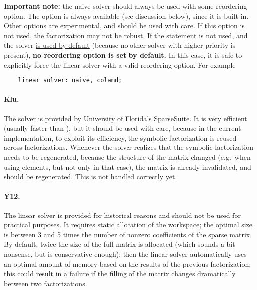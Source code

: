\bigskip
\begin{minipage}{.9\textwidth}
\textbf{Important note:} the naive solver should always be used
with some reordering option.
The  option is always available (see discussion below),
since it is built-in.
Other options are experimental, and should be used with care.
If this option is not used, the factorization may not be robust.
If the  statement is \underline{not used},
and the  solver \underline{is used by default}
(because no other solver with higher priority is present),
\textbf{no reordering option is set by default.}
In this case, it is safe to explicitly force the linear solver
with a valid reordering option.  For example
\begin{verbatim}
    linear solver: naive, colamd;
\end{verbatim}
\end{minipage}

\bigskip

\paragraph{Klu.}
The  solver is provided by University of Florida's SparseSuite.
It is very efficient (usually faster than ),
but it should be used with care, because in the current implementation,
to exploit its efficiency, the symbolic factorization is reused across
factorizations.
Whenever the solver realizes that the symbolic factorization
needs to be regenerated, because the structure of the matrix changed
(e.g.\ when using  elements, but not only in that case),
the matrix is already invalidated, and should be regenerated.
This is not handled correctly yet.

\paragraph{Y12.}
The  linear solver is provided for historical reasons
and should not be used for practical purposes.
It requires static allocation of the workspace;
the optimal size  is between 3 and 5 times
the number of nonzero coefficients of the sparse matrix.
By default, twice the size of the full matrix is allocated
(which sounds a bit nonsense, but is conservative enough);
then the linear solver automatically uses an optimal amount of memory
based on the results of the previous factorization; this could
result in a failure if the filling of the matrix changes 
dramatically between two factorizations.


